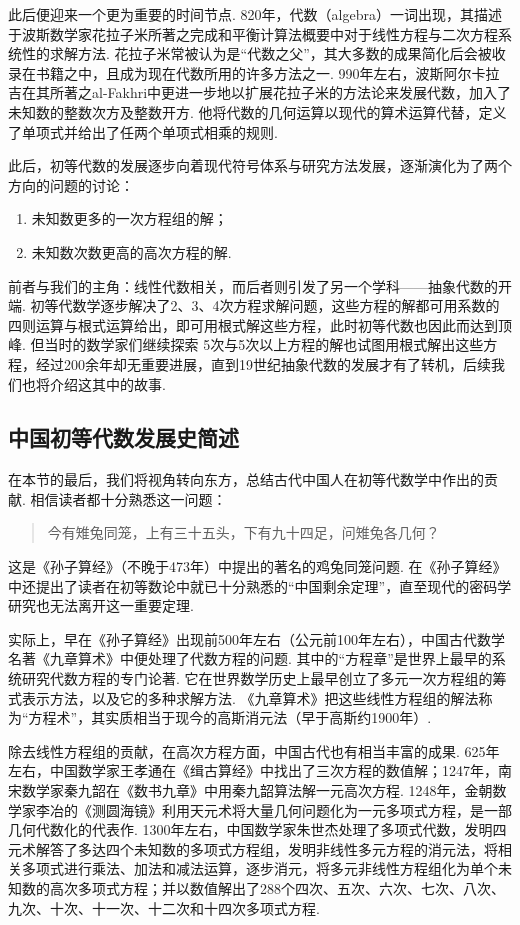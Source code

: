 此后便迎来一个更为重要的时间节点. 820年，代数（algebra）一词出现，其描述于波斯数学家花拉子米所著之完成和平衡计算法概要中对于线性方程与二次方程系统性的求解方法. 花拉子米常被认为是``代数之父''，其大多数的成果简化后会被收录在书籍之中，且成为现在代数所用的许多方法之一. 990年左右，波斯阿尔卡拉吉在其所著之al-Fakhri中更进一步地以扩展花拉子米的方法论来发展代数，加入了未知数的整数次方及整数开方. 他将代数的几何运算以现代的算术运算代替，定义了单项式并给出了任两个单项式相乘的规则.

此后，初等代数的发展逐步向着现代符号体系与研究方法发展，逐渐演化为了两个方向的问题的讨论：
\begin{enumerate}
    \item 未知数更多的一次方程组的解；

    \item 未知数次数更高的高次方程的解.
\end{enumerate}

前者与我们的主角：线性代数相关，而后者则引发了另一个学科——抽象代数的开端. 初等代数学逐步解决了2、3、4次方程求解问题，这些方程的解都可用系数的四则运算与根式运算给出，即可用根式解这些方程，此时初等代数也因此而达到顶峰. 但当时的数学家们继续探索
5次与5次以上方程的解也试图用根式解出这些方程，经过200余年却无重要进展，直到19世纪抽象代数的发展才有了转机，后续我们也将介绍这其中的故事.

\subsection{中国初等代数发展史简述}

在本节的最后，我们将视角转向东方，总结古代中国人在初等代数学中作出的贡献. 相信读者都十分熟悉这一问题：
\begin{quote}
    \kaishu
    今有雉兔同笼，上有三十五头，下有九十四足，问雉兔各几何？
\end{quote}

这是《孙子算经》（不晚于473年）中提出的著名的鸡兔同笼问题. 在《孙子算经》中还提出了读者在初等数论中就已十分熟悉的``中国剩余定理''，直至现代的密码学研究也无法离开这一重要定理.

实际上，早在《孙子算经》出现前500年左右（公元前100年左右），中国古代数学名著《九章算术》中便处理了代数方程的问题. 其中的``方程章''是世界上最早的系统研究代数方程的专门论著. 它在世界数学历史上最早创立了多元一次方程组的筹式表示方法，以及它的多种求解方法. 《九章算术》把这些线性方程组的解法称为``方程术''，其实质相当于现今的高斯消元法（早于高斯约1900年）.

除去线性方程组的贡献，在高次方程方面，中国古代也有相当丰富的成果. 625年左右，中国数学家王孝通在《缉古算经》中找出了三次方程的数值解；1247年，南宋数学家秦九韶在《数书九章》中用秦九韶算法解一元高次方程. 1248年，金朝数学家李冶的《测圆海镜》利用天元术将大量几何问题化为一元多项式方程，是一部几何代数化的代表作. 1300年左右，中国数学家朱世杰处理了多项式代数，发明四元术解答了多达四个未知数的多项式方程组，发明非线性多元方程的消元法，将相关多项式进行乘法、加法和减法运算，逐步消元，将多元非线性方程组化为单个未知数的高次多项式方程；并以数值解出了288个四次、五次、六次、七次、八次、九次、十次、十一次、十二次和十四次多项式方程.

